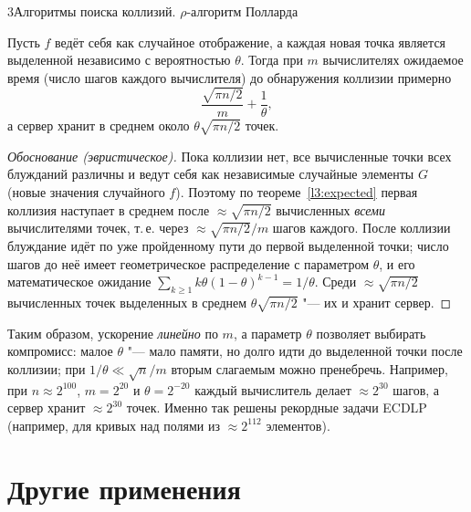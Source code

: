 \begin{lecture}{3}{Алгоритмы поиска коллизий. \texorpdfstring{$\rho$}{ρ}-алгоритм Полларда}
\begin{theorem}\label{l3:dp}
Пусть $f$ ведёт себя как случайное отображение, а каждая новая точка является выделенной
независимо с вероятностью $\theta$. Тогда при $m$ вычислителях ожидаемое время (число шагов
каждого вычислителя) до обнаружения коллизии примерно
\[
  \frac{\sqrt{\pi n/2}}{m} + \frac{1}{\theta},
\]
а сервер хранит в среднем около $\theta\sqrt{\pi n/2}$ точек.
\end{theorem}

\begin{proof}[Обоснование (эвристическое)]
Пока коллизии нет, все вычисленные точки всех блужданий различны и ведут себя как
независимые случайные элементы $G$ (новые значения случайного $f$). Поэтому по
теореме~\ref{l3:expected} первая коллизия наступает в среднем после
$\approx \sqrt{\pi n/2}$ вычисленных \emph{всеми} вычислителями точек, т.\,е. через
$\approx \sqrt{\pi n/2}/m$ шагов каждого. После коллизии блуждание идёт по уже пройденному
пути до первой выделенной точки; число шагов до неё имеет геометрическое распределение
с параметром $\theta$, и его математическое ожидание
$\sum_{k \ge 1} k\theta(1 - \theta)^{k-1} = 1/\theta$. Среди $\approx \sqrt{\pi n/2}$
вычисленных точек выделенных в среднем $\theta\sqrt{\pi n/2}$ "--- их и хранит сервер.
\end{proof}

Таким образом, ускорение \emph{линейно} по $m$, а параметр $\theta$ позволяет выбирать
компромисс: малое $\theta$ "--- мало памяти, но долго идти до выделенной точки после
коллизии; при $1/\theta \ll \sqrt n/m$ вторым слагаемым можно пренебречь. Например, при
$n \approx 2^{100}$, $m = 2^{20}$ и $\theta = 2^{-20}$ каждый вычислитель делает $\approx 2^{30}$
шагов, а сервер хранит $\approx 2^{30}$ точек. Именно так решены рекордные задачи ECDLP
(например, для кривых над полями из $\approx 2^{112}$ элементов).



\section{Другие применения}


\end{lecture}
